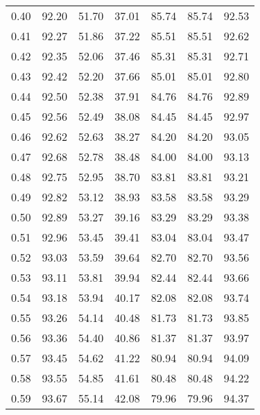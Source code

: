 \begin{tabular}{|c|c|c|c|c|c|c|}
      0.40 &     92.20 &     51.70 &      37.01 &   85.74 &      85.74 &         92.53 \\
      0.41 &     92.27 &     51.86 &      37.22 &   85.51 &      85.51 &         92.62 \\
      0.42 &     92.35 &     52.06 &      37.46 &   85.31 &      85.31 &         92.71 \\
      0.43 &     92.42 &     52.20 &      37.66 &   85.01 &      85.01 &         92.80 \\
      0.44 &     92.50 &     52.38 &      37.91 &   84.76 &      84.76 &         92.89 \\
      0.45 &     92.56 &     52.49 &      38.08 &   84.45 &      84.45 &         92.97 \\
      0.46 &     92.62 &     52.63 &      38.27 &   84.20 &      84.20 &         93.05 \\
      0.47 &     92.68 &     52.78 &      38.48 &   84.00 &      84.00 &         93.13 \\
      0.48 &     92.75 &     52.95 &      38.70 &   83.81 &      83.81 &         93.21 \\
      0.49 &     92.82 &     53.12 &      38.93 &   83.58 &      83.58 &         93.29 \\
      0.50 &     92.89 &     53.27 &      39.16 &   83.29 &      83.29 &         93.38 \\
      0.51 &     92.96 &     53.45 &      39.41 &   83.04 &      83.04 &         93.47 \\
      0.52 &     93.03 &     53.59 &      39.64 &   82.70 &      82.70 &         93.56 \\
      0.53 &     93.11 &     53.81 &      39.94 &   82.44 &      82.44 &         93.66 \\
      0.54 &     93.18 &     53.94 &      40.17 &   82.08 &      82.08 &         93.74 \\
      0.55 &     93.26 &     54.14 &      40.48 &   81.73 &      81.73 &         93.85 \\
      0.56 &     93.36 &     54.40 &      40.86 &   81.37 &      81.37 &         93.97 \\
      0.57 &     93.45 &     54.62 &      41.22 &   80.94 &      80.94 &         94.09 \\
      0.58 &     93.55 &     54.85 &      41.61 &   80.48 &      80.48 &         94.22 \\
      0.59 &     93.67 &     55.14 &      42.08 &   79.96 &      79.96 &         94.37 \\

\end{tabular}
